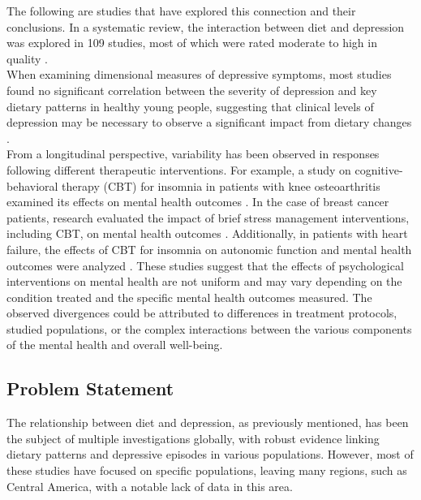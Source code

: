 \documentclass[jou]{apa7}
\begin{document}
The following are studies that have explored this connection and their conclusions. In a systematic review, the interaction between diet and depression was explored in 109 studies, most of which were rated moderate to high in quality \parencite{Toenders2022}.\\

When examining dimensional measures of depressive symptoms, most studies found no significant correlation between the severity of depression and key dietary patterns in healthy young people, suggesting that clinical levels of depression may be necessary to observe a significant impact from dietary changes \parencite{Toenders2022}.\\

From a longitudinal perspective, variability has been observed in responses following different therapeutic interventions. For example, a study on cognitive-behavioral therapy (CBT) for insomnia in patients with knee osteoarthritis examined its effects on mental health outcomes \parencite{munPreliminaryExaminationEffects2024}. In the case of breast cancer patients, research evaluated the impact of brief stress management interventions, including CBT, on mental health outcomes \parencite{taubEffectsRandomizedTrial2019}. Additionally, in patients with heart failure, the effects of CBT for insomnia on autonomic function and mental health outcomes were analyzed \parencite{redekerEffectsCognitiveBehavioral2020}. These studies suggest that the effects of psychological interventions on mental health are not uniform and may vary depending on the condition treated and the specific mental health outcomes measured. The observed divergences could be attributed to differences in treatment protocols, studied populations, or the complex interactions between the various components of the mental health and overall well-being.


\subsection{Problem Statement}

The relationship between diet and depression, as previously mentioned, has been the subject of multiple investigations globally, with robust evidence linking dietary patterns and depressive episodes in various populations. However, most of these studies have focused on specific populations, leaving many regions, such as Central America, with a notable lack of data in this area.\\
\end{document}
